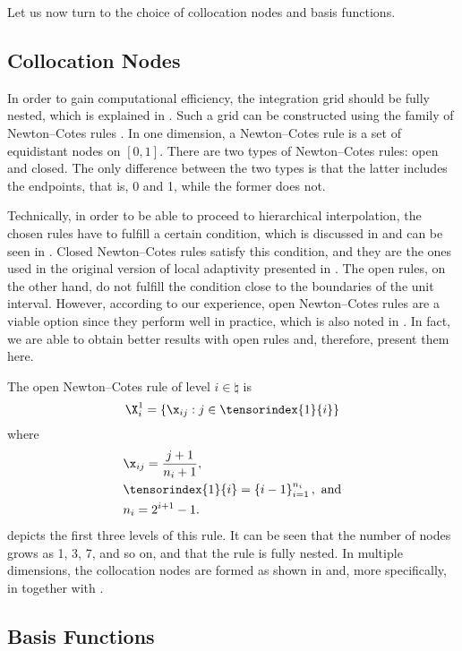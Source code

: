 Let us now turn to the choice of collocation nodes and basis functions.

\subsection{Collocation Nodes}

In order to gain computational efficiency, the integration grid should be fully
nested, which is explained in . Such a grid can be
constructed using the family of Newton--Cotes rules \cite{ma2009}. In one
dimension, a Newton--Cotes rule is a set of equidistant nodes on $[0, 1]$. There
are two types of Newton--Cotes rules: open and closed. The only difference
between the two types is that the latter includes the endpoints, that is, 0 and
1, while the former does not.

Technically, in order to be able to proceed to hierarchical interpolation, the
chosen rules have to fulfill a certain condition, which is discussed in
 and can be seen in
. Closed Newton--Cotes rules satisfy this
condition, and they are the ones used in the original version of local
adaptivity presented in \cite{ma2009}. The open rules, on the other hand, do not
fulfill the condition close to the boundaries of the unit interval. However,
according to our experience, open Newton--Cotes rules are a viable option since
they perform well in practice, which is also noted in \cite{klimke2006}. In
fact, we are able to obtain better results with open rules and, therefore,
present them here.

The open Newton--Cotes rule of level $i \in \natural$ is
\[
  \X^1_i = \left\{ \x_{ij}: j \in \tensorindex{1}{i} \right\}
\]
where
\begin{align*}
  & \x_{ij} = \frac{j + 1}{n_i + 1}, \\
  & \tensorindex{1}{i} = \left\{ i - 1 \right\}_{i = 1}^{n_i}, \text{ and} \\
  & n_i = 2^{i + 1} - 1.
\end{align*}
 depicts the first three levels of this rule. It can be seen
that the number of nodes grows as 1, 3, 7, and so on, and that the rule is fully
nested. In multiple dimensions, the collocation nodes are formed as shown in
 and, more specifically, in
 together with .

\subsection{Basis Functions}

